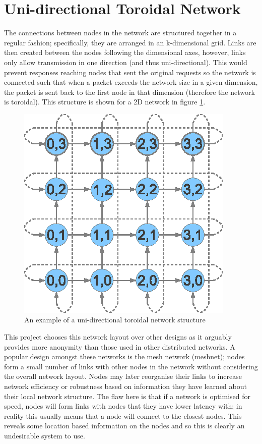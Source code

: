 \documentclass[ %
                    author={Luke Murray},
                supervisor={Dr. Simon Hollis},
                     title={Shadow Peer-to-Peer Networks},
                  subtitle={},
                    degree={MEng},
                      year={2013} ]{thesis}
\begin{document}
\section{Uni-directional Toroidal Network}

The connections between nodes in the network are structured together in a regular fashion; specifically, they are arranged in an k-dimensional grid. Links are then created between the nodes following the dimensional axes, however, links only allow transmission in one direction (and thus uni-directional). This would prevent responses reaching nodes that sent the original requests so the network is connected such that when a packet exceeds the network size in a given dimension, the packet is sent back to the first node in that dimension (therefore the network is toroidal). This structure is shown for a 2D network in figure \ref{toroid}.

\begin{figure}[h]
\centering
\includegraphics{diagrams/network_toroidal.eps}
\caption{An example of a uni-directional toroidal network structure}
\label{toroid}
\end{figure}

This project chooses this network layout over other designs as it arguably provides more anonymity than those used in other distributed networks. A popular design amongst these networks is the mesh network (meshnet); nodes form a small number of links with other nodes in the network without considering the overall network layout. Nodes may later reorganise their links to increase network efficiency or robustness based on information they have learned about their local network structure. The flaw here is that if a network is optimised for speed, nodes will form links with nodes that they have lower latency with; in reality this usually means that a node will connect to the closest nodes. This reveals some location based information on the nodes and so this is clearly an undesirable system to use.
\end{document}
